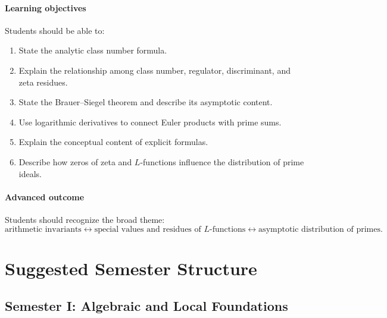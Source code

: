 \documentclass[11pt]{article}
\begin{document}
\paragraph{Learning objectives}
Students should be able to:
\begin{enumerate}
    \item State the analytic class number formula.
    \item Explain the relationship among class number, regulator, discriminant, and zeta residues.
    \item State the Brauer--Siegel theorem and describe its asymptotic content.
    \item Use logarithmic derivatives to connect Euler products with prime sums.
    \item Explain the conceptual content of explicit formulas.
    \item Describe how zeros of zeta and $L$-functions influence the distribution of prime ideals.
\end{enumerate}

\paragraph{Advanced outcome}
Students should recognize the broad theme:
\[
\text{arithmetic invariants}
\longleftrightarrow
\text{special values and residues of }L\text{-functions}
\longleftrightarrow
\text{asymptotic distribution of primes}.
\]

\section{Suggested Semester Structure}

\subsection*{Semester I: Algebraic and Local Foundations}
\end{document}
